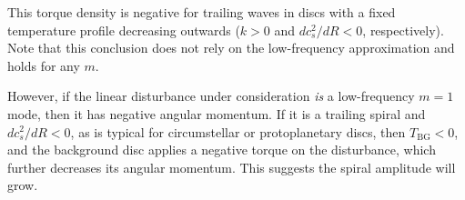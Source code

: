 This torque density is negative for trailing waves in discs with
a fixed temperature profile decreasing outwards ($k>0$ and $dc_s^2/dR<0$,
respectively). Note that this conclusion does not rely on the
low-frequency approximation and holds for any $m$.   

However, if the linear disturbance under consideration \emph{is} a
low-frequency $m=1$ mode, then it has negative angular
momentum. If it is a trailing spiral and $dc_s^2/dR<0$, as is typical
for circumstellar or protoplanetary discs, then $T_\mathrm{BG}<0$, and
the background disc applies a negative torque on the disturbance,
which further decreases its angular momentum. This suggests the spiral
amplitude will grow.    

